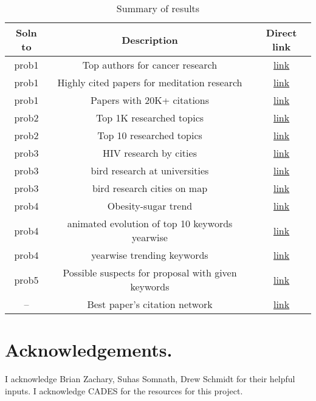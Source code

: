 \documentclass{article}
\begin{document}
\begin{table}
\begin{center}
\begin{tabular}{|c|c|c|}
\hline
\textbf{Soln to} & \textbf{Description} & \textbf{Direct link} \\
\hline
prob1 & Top authors for cancer research & \href{https://github.com/ketancmaheshwari/SMC18/blob/master/results/cancer_research_topauths.txt}{link} \\
prob1 & Highly cited papers for meditation research & \href{https://github.com/ketancmaheshwari/SMC18/blob/master/results/meditation_highly_cited.txt}{link} \\
prob1 & Papers with 20K+ citations & \href{https://github.com/ketancmaheshwari/SMC18/blob/master/results/top_papers.txt}{link} \\
prob2 & Top 1K researched topics & \href{https://github.com/ketancmaheshwari/SMC18/blob/master/results/top_1K_words_kw_abs_title.txt}{link} \\
prob2 & Top 10 researched topics & \href{https://github.com/ketancmaheshwari/SMC18/blob/master/results/top_10_keywords_by_freq.txt}{link} \\
prob3 & HIV research by cities & \href{https://github.com/ketancmaheshwari/SMC18/blob/master/results/HIV_AIDS_Research_Cities.txt
}{link} \\
prob3 & bird research at universities & \href{https://github.com/ketancmaheshwari/SMC18/blob/master/results/birds_research_at_univs.txt}{link} \\
prob3 & bird research cities on map & \href{https://github.com/ketancmaheshwari/SMC18/blob/master/results/bird_research_cities.png}{link} \\
prob4 & Obesity-sugar trend & \href{https://github.com/ketancmaheshwari/SMC18/blob/master/results/obesity_sugar.pdf}{link} \\
prob4 & animated evolution of top 10 keywords yearwise & \href{https://github.com/ketancmaheshwari/SMC18/blob/master/results/freqwordsoveryears.mkv}{link} \\
prob4 & yearwise trending keywords & \href{https://github.com/ketancmaheshwari/SMC18/blob/master/results/yearwise_trending_keywords.txt}{link} \\
prob5 & Possible suspects for proposal with given keywords & \href{https://github.com/ketancmaheshwari/SMC18/blob/master/results/suspects.txt}{link} \\
-- & Best paper's citation network & \href{https://github.com/ketancmaheshwari/SMC18/blob/master/results/best_papers.svg}{link} \\
\hline
\end{tabular}
\end{center}
\caption{Summary of results}
\label{tbl:results}
\end{table}

\section*{Acknowledgements.}
I acknowledge Brian Zachary, Suhas Somnath, Drew Schmidt for their helpful
inputs. I acknowledge CADES for the resources for this project.
\end{document}
